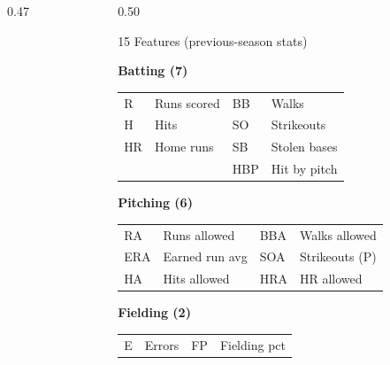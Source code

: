 \documentclass{beamer}
\begin{document}
\begin{frame}[t]
\begin{columns}[T]
\begin{column}{0.47\textwidth}
\end{column}

\begin{column}{0.50\textwidth}

\begin{block}{\scriptsize 15 Features (previous-season stats)}
\vspace{-2pt}
{\scriptsize

\textbf{Batting (7)}\\[1pt]
\begin{tabular}{@{}l@{\;}l@{\qquad}l@{\;}l@{}}
  R  & Runs scored  & BB  & Walks \\
  H  & Hits         & SO  & Strikeouts \\
  HR & Home runs    & SB  & Stolen bases \\
     &              & HBP & Hit by pitch \\
\end{tabular}

\vspace{3pt}
\textbf{Pitching (6)}\\[1pt]
\begin{tabular}{@{}l@{\;}l@{\qquad}l@{\;}l@{}}
  RA  & Runs allowed   & BBA & Walks allowed \\
  ERA & Earned run avg & SOA & Strikeouts (P) \\
  HA  & Hits allowed   & HRA & HR allowed \\
\end{tabular}

\vspace{3pt}
\textbf{Fielding (2)}\\[1pt]
\begin{tabular}{@{}l@{\;}l@{\qquad}l@{\;}l@{}}
  E  & Errors & FP & Fielding pct \\
\end{tabular}

}
\vspace{-2pt}
\end{block}

\end{column}
\end{columns}

\end{frame}
\end{document}
